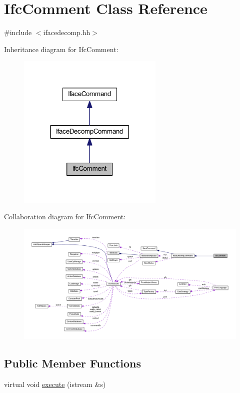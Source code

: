 \hypertarget{class_ifc_comment}{}\section{Ifc\+Comment Class Reference}
\label{class_ifc_comment}


{\ttfamily \#include $<$ifacedecomp.\+hh$>$}



Inheritance diagram for Ifc\+Comment\+:
\nopagebreak
\begin{figure}[H]
\begin{center}
\leavevmode
\includegraphics[width=197pt]{class_ifc_comment__inherit__graph}
\end{center}
\end{figure}


Collaboration diagram for Ifc\+Comment\+:
\nopagebreak
\begin{figure}[H]
\begin{center}
\leavevmode
\includegraphics[width=350pt]{class_ifc_comment__coll__graph}
\end{center}
\end{figure}
\subsection*{Public Member Functions}
\begin{DoxyCompactItemize}
\item 
virtual void \mbox{\hyperlink{class_ifc_comment_ab3ec87a9d5332b0f4c10bd349f807650}{execute}} (istream \&s)
\end{DoxyCompactItemize}
